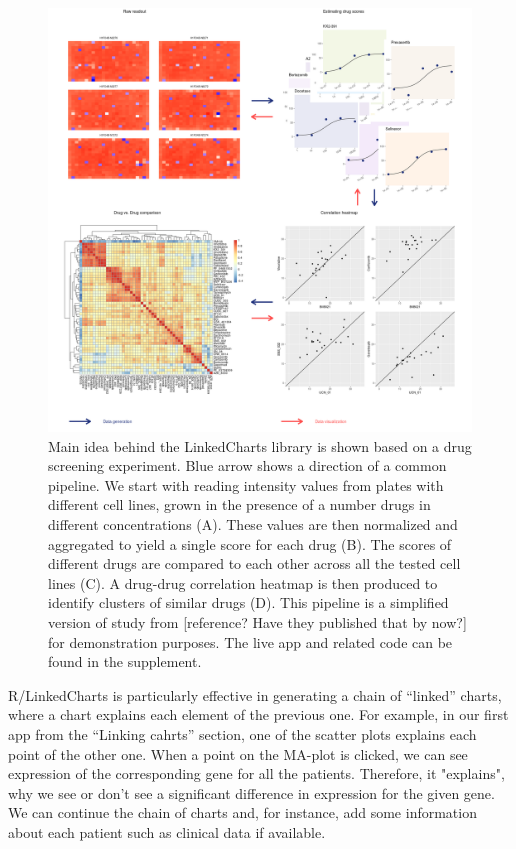 \documentclass[twocolumn,10pt]{article}
\begin{document}
\begin{figure}
	\includegraphics[width=\textwidth]{FigC/figC.png}
	\caption{Main idea behind the LinkedCharts library is shown based on a drug screening experiment. Blue arrow shows a direction of a common pipeline. We start with reading intensity values from plates with different cell lines, grown in the presence of a number drugs in different concentrations (A). These values are then normalized and aggregated to yield a single score for each drug (B). The scores of different drugs are compared to each other across all the tested cell lines (C). A drug-drug correlation heatmap is then produced to identify clusters of similar drugs (D). This pipeline is a simplified version of study from [reference? Have they published that by now?] for demonstration purposes. The live app and related code can be found in the supplement.}
	\label{FigC}
\end{figure}

R/LinkedCharts is particularly effective in generating a chain of ``linked'' charts, where a chart explains each element of the previous one. For example, in our first app from the ``Linking cahrts'' section, one of the scatter plots explains each point of the other one. When a point on the MA-plot is clicked, we can see expression of the corresponding gene for all the patients. Therefore, it "explains", why we see or don't see a significant difference in expression for the given gene. We can continue the chain of charts and, for instance, add some information about each patient such as clinical data if available. 
\end{document}
